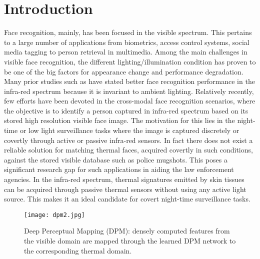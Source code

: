 \documentclass[smallextended,natbib]{svjour3}       \usepackage{graphicx}
\begin{document}
\section{Introduction}
\label{sec:intro}
Face recognition, mainly, has been focused in the visible spectrum. This pertains to a large number of applications from biometrics, access control systems, social media tagging to person retrieval in multimedia. Among the main challenges in visible face recognition, the different lighting/illumination condition has proven to be one of the big factors for appearance change and performance degradation. Many prior studies such as \cite{li2007, socolinsky2002, nicolo2012, Klare13} have stated better face recognition performance in the infra-red spectrum because it is invariant to ambient lighting. Relatively recently, few efforts have been devoted in the cross-modal face recognition scenarios, where the objective is to identify a person captured in infra-red spectrum based on its stored high resolution visible face image. The motivation for this lies in the night-time or low light surveillance tasks where the image is captured discretely or covertly through active or passive infra-red sensors. In fact there does not exist a reliable solution for matching thermal faces, acquired covertly in such conditions, against the stored visible database such as police mugshots. This poses a significant research gap for such applications in aiding the law enforcement agencies. In the infra-red spectrum, thermal signatures emitted by skin tissues can be acquired through passive thermal sensors without using any active light source. This makes it an ideal candidate for covert night-time surveillance tasks.

\begin{figure}
\centering
    \texttt{[image: dpm2.jpg]}
    \caption{Deep Perceptual Mapping (DPM): densely computed features from the visible domain are mapped through the learned DPM network to the corresponding thermal domain.}
    \label{fig:1}
    \end{figure}
    
\end{document}
